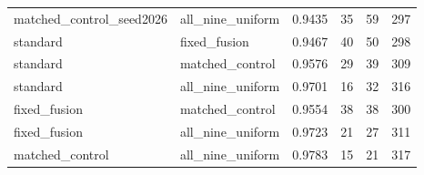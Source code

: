 \begin{tabular}{llrrrr}
matched\_control\_seed2026 & all\_nine\_uniform & 0.9435 & 35 & 59 & 297 \\
standard & fixed\_fusion & 0.9467 & 40 & 50 & 298 \\
standard & matched\_control & 0.9576 & 29 & 39 & 309 \\
standard & all\_nine\_uniform & 0.9701 & 16 & 32 & 316 \\
fixed\_fusion & matched\_control & 0.9554 & 38 & 38 & 300 \\
fixed\_fusion & all\_nine\_uniform & 0.9723 & 21 & 27 & 311 \\
matched\_control & all\_nine\_uniform & 0.9783 & 15 & 21 & 317 \\
\bottomrule
\end{tabular}
